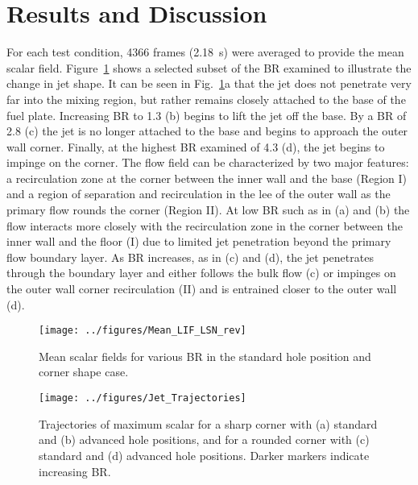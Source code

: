 \documentclass[10pt, twocolumn]{article}
\begin{document}
\section*{Results and Discussion} 
For each test condition, 4366 frames (2.18~s) were averaged to provide the mean scalar field. Figure~\ref{fig:mean_field} shows a selected subset of the BR examined to illustrate the change in jet shape. It can be seen in Fig.~\ref{fig:mean_field}a that the jet does not penetrate very far into the mixing region, but rather remains closely attached to the base of the fuel plate. Increasing BR to 1.3 (b) begins to lift the jet off the base. By a BR of 2.8 (c) the jet is no longer attached to the base and begins to approach the outer wall corner. Finally, at the highest BR examined of 4.3 (d), the jet begins to impinge on the corner. The flow field can be characterized by two major features: a recirculation zone at the corner between the inner wall and the base (Region I) and a region of separation and recirculation in the lee of the outer wall as the primary flow rounds the corner (Region II). At low BR such as in (a) and (b) the flow interacts more closely with the recirculation zone in the corner between the inner wall and the floor (I) due to limited jet penetration beyond the primary flow boundary layer. As BR increases, as in (c) and (d), the jet penetrates through the boundary layer and either follows the bulk flow (c) or impinges on the outer wall corner recirculation (II) and is entrained closer to the outer wall (d).

\begin{figure}[t!]
	\centering
	\texttt{[image: ../figures/Mean\_LIF\_LSN\_rev]}
	\caption{Mean scalar fields for various BR in the standard hole position and corner shape case.}
	\label{fig:mean_field}
\end{figure}

\begin{figure}[b!]
	\centering
	\texttt{[image: ../figures/Jet\_Trajectories]}
	\caption{Trajectories of maximum scalar for a sharp corner with (a) standard and (b) advanced hole positions, and for a rounded corner with (c) standard and (d) advanced hole positions. Darker markers indicate increasing BR.}
	\label{fig:traj}
\end{figure}
\end{document}
